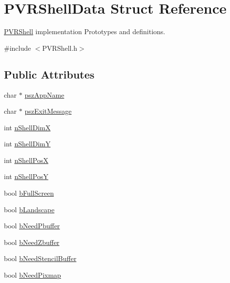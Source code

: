 \hypertarget{struct_p_v_r_shell_data}{\section{P\+V\+R\+Shell\+Data Struct Reference}
\label{struct_p_v_r_shell_data}
}


\hyperlink{class_p_v_r_shell}{P\+V\+R\+Shell} implementation Prototypes and definitions.  




{\ttfamily \#include $<$P\+V\+R\+Shell.\+h$>$}

\subsection*{Public Attributes}
\begin{DoxyCompactItemize}
\item 
char $\ast$ \hyperlink{struct_p_v_r_shell_data_ad2f1bea5e6431c6e0ea5e911404187aa}{psz\+App\+Name}
\item 
char $\ast$ \hyperlink{struct_p_v_r_shell_data_a9fe9e0aa9936fce1a0b1fa1e6f53ee84}{psz\+Exit\+Message}
\item 
int \hyperlink{struct_p_v_r_shell_data_a98d3c96ed9238ccc0d579693c1c46e93}{n\+Shell\+Dim\+X}
\item 
int \hyperlink{struct_p_v_r_shell_data_ad554a33b4a399703abaa48d7e75df28e}{n\+Shell\+Dim\+Y}
\item 
int \hyperlink{struct_p_v_r_shell_data_a0961542499b7cd4b12b0956a1fe688aa}{n\+Shell\+Pos\+X}
\item 
int \hyperlink{struct_p_v_r_shell_data_af3e9b9c86bef2d83b1c3b4edfacbb7f9}{n\+Shell\+Pos\+Y}
\item 
bool \hyperlink{struct_p_v_r_shell_data_acaed6a0a872d005e5e9fb057a7fca389}{b\+Full\+Screen}
\item 
bool \hyperlink{struct_p_v_r_shell_data_a6bab92dd53e597be3ab6655722823361}{b\+Landscape}
\item 
bool \hyperlink{struct_p_v_r_shell_data_adb7dcb92721adcb3361425e8483a5ed0}{b\+Need\+Pbuffer}
\item 
bool \hyperlink{struct_p_v_r_shell_data_a89301344798402c755de76d18db45f64}{b\+Need\+Zbuffer}
\item 
bool \hyperlink{struct_p_v_r_shell_data_ab3f6a20c714a67b2f337d1ca578e54ad}{b\+Need\+Stencil\+Buffer}
\item 
bool \hyperlink{struct_p_v_r_shell_data_ae05b7b197352650f87de28f169f151a0}{b\+Need\+Pixmap}
\item 

\end{DoxyCompactItemize}
